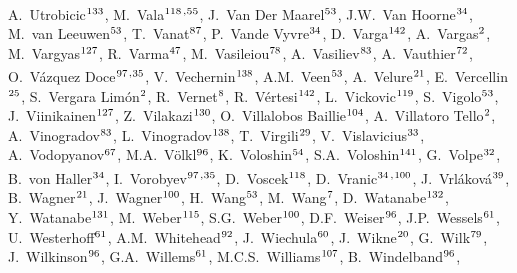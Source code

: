 \begin{flushleft}
A.~Utrobicic$^\textrm{\scriptsize 133}$,
M.~Vala$^\textrm{\scriptsize 118}$\textsuperscript{,}$^\textrm{\scriptsize 55}$,
J.~Van Der Maarel$^\textrm{\scriptsize 53}$,
J.W.~Van Hoorne$^\textrm{\scriptsize 34}$,
M.~van Leeuwen$^\textrm{\scriptsize 53}$,
T.~Vanat$^\textrm{\scriptsize 87}$,
P.~Vande Vyvre$^\textrm{\scriptsize 34}$,
D.~Varga$^\textrm{\scriptsize 142}$,
A.~Vargas$^\textrm{\scriptsize 2}$,
M.~Vargyas$^\textrm{\scriptsize 127}$,
R.~Varma$^\textrm{\scriptsize 47}$,
M.~Vasileiou$^\textrm{\scriptsize 78}$,
A.~Vasiliev$^\textrm{\scriptsize 83}$,
A.~Vauthier$^\textrm{\scriptsize 72}$,
O.~V\'azquez Doce$^\textrm{\scriptsize 97}$\textsuperscript{,}$^\textrm{\scriptsize 35}$,
V.~Vechernin$^\textrm{\scriptsize 138}$,
A.M.~Veen$^\textrm{\scriptsize 53}$,
A.~Velure$^\textrm{\scriptsize 21}$,
E.~Vercellin$^\textrm{\scriptsize 25}$,
S.~Vergara Lim\'on$^\textrm{\scriptsize 2}$,
R.~Vernet$^\textrm{\scriptsize 8}$,
R.~V\'ertesi$^\textrm{\scriptsize 142}$,
L.~Vickovic$^\textrm{\scriptsize 119}$,
S.~Vigolo$^\textrm{\scriptsize 53}$,
J.~Viinikainen$^\textrm{\scriptsize 127}$,
Z.~Vilakazi$^\textrm{\scriptsize 130}$,
O.~Villalobos Baillie$^\textrm{\scriptsize 104}$,
A.~Villatoro Tello$^\textrm{\scriptsize 2}$,
A.~Vinogradov$^\textrm{\scriptsize 83}$,
L.~Vinogradov$^\textrm{\scriptsize 138}$,
T.~Virgili$^\textrm{\scriptsize 29}$,
V.~Vislavicius$^\textrm{\scriptsize 33}$,
A.~Vodopyanov$^\textrm{\scriptsize 67}$,
M.A.~V\"{o}lkl$^\textrm{\scriptsize 96}$,
K.~Voloshin$^\textrm{\scriptsize 54}$,
S.A.~Voloshin$^\textrm{\scriptsize 141}$,
G.~Volpe$^\textrm{\scriptsize 32}$,
B.~von Haller$^\textrm{\scriptsize 34}$,
I.~Vorobyev$^\textrm{\scriptsize 97}$\textsuperscript{,}$^\textrm{\scriptsize 35}$,
D.~Voscek$^\textrm{\scriptsize 118}$,
D.~Vranic$^\textrm{\scriptsize 34}$\textsuperscript{,}$^\textrm{\scriptsize 100}$,
J.~Vrl\'{a}kov\'{a}$^\textrm{\scriptsize 39}$,
B.~Wagner$^\textrm{\scriptsize 21}$,
J.~Wagner$^\textrm{\scriptsize 100}$,
H.~Wang$^\textrm{\scriptsize 53}$,
M.~Wang$^\textrm{\scriptsize 7}$,
D.~Watanabe$^\textrm{\scriptsize 132}$,
Y.~Watanabe$^\textrm{\scriptsize 131}$,
M.~Weber$^\textrm{\scriptsize 115}$,
S.G.~Weber$^\textrm{\scriptsize 100}$,
D.F.~Weiser$^\textrm{\scriptsize 96}$,
J.P.~Wessels$^\textrm{\scriptsize 61}$,
U.~Westerhoff$^\textrm{\scriptsize 61}$,
A.M.~Whitehead$^\textrm{\scriptsize 92}$,
J.~Wiechula$^\textrm{\scriptsize 60}$,
J.~Wikne$^\textrm{\scriptsize 20}$,
G.~Wilk$^\textrm{\scriptsize 79}$,
J.~Wilkinson$^\textrm{\scriptsize 96}$,
G.A.~Willems$^\textrm{\scriptsize 61}$,
M.C.S.~Williams$^\textrm{\scriptsize 107}$,
B.~Windelband$^\textrm{\scriptsize 96}$,

\end{flushleft}

